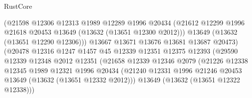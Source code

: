 \begin{lexlean}{RustCore}
\begin{coremodule}
                                    (@21598
                                      @12306
                                      @12313
                                      @1989
                                      @12289
                                      @1996
                                      @20434
                                      (@21612
                                        @12299
                                        @1996
                                        @21618
                                        @20453
                                        @13649
                                        (@13632 (@13651 @12300 @2012)))
                                      @13649
                                      (@13632 (@13651 @12290 @12306)))
                                    @13667
                                    @13671
                                    @13676
                                    @13681
                                    @13687
                                    @20473)
                                  (@20478
                                    @12316
                                    @1247
                                    @1457
                                    @45
                                    @12339
                                    @12351
                                    @12375
                                    @12393
                                    (@29590
                                      @12339
                                      @12348
                                      @2012
                                      @12351
                                      (@21658
                                        @12339
                                        @12346
                                        @2079
                                        (@21226
                                          @12338
                                          @12345
                                          @1989
                                          @12321
                                          @1996
                                          @20434
                                          (@21240
                                            @12331
                                            @1996
                                            @21246
                                            @20453
                                            @13649
                                            (@13632 (@13651 @12332 @2012)))
                                          @13649
                                          (@13632 (@13651 @12322 @12338)))

\end{coremodule}
\end{lexlean}
